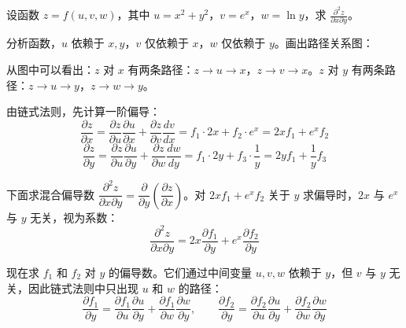\begin{myexample}
  设函数 $z = f(u,v,w)$，其中 $u = x^2 + y^2$，$v = e^x$，$w = \ln y$，求 $\frac{\partial^2 z}{\partial x \partial y}$。

  分析函数，\(u\) 依赖于 \(x,y\)，\(v\) 仅依赖于 \(x\)，\(w\) 仅依赖于 \(y\)。画出路径关系图：

\begin{center}
\end{center}

从图中可以看出：\(z\) 对 \(x\) 有两条路径：\(z \to u \to x\)，\(z \to v \to x\)。\(z\) 对 \(y\) 有两条路径：\(z \to u \to y\)，\(z \to w \to y\)。

由链式法则，先计算一阶偏导：
\[
\frac{\partial z}{\partial x} = \frac{\partial z}{\partial u} \frac{\partial u}{\partial x} + \frac{\partial z}{\partial v} \frac{d v}{d x}
= f_1 \cdot 2x + f_2 \cdot e^x = 2x f_1 + e^x f_2
\]
\[
\frac{\partial z}{\partial y} = \frac{\partial z}{\partial u} \frac{\partial u}{\partial y} + \frac{\partial z}{\partial w} \frac{d w}{d y}
= f_1 \cdot 2y + f_3 \cdot \frac{1}{y} = 2y f_1 + \frac{1}{y} f_3
\]

下面求混合偏导数 \(\dfrac{\partial^2 z}{\partial x \partial y} = \dfrac{\partial}{\partial y}\!\left(\dfrac{\partial z}{\partial x}\right)\)。对 \(2x f_1 + e^x f_2\) 关于 \(y\) 求偏导时，\(2x\) 与 \(e^x\) 与 \(y\) 无关，视为系数：
\[
\frac{\partial^2 z}{\partial x \partial y} = 2x \frac{\partial f_1}{\partial y} + e^x \frac{\partial f_2}{\partial y}
\]

现在求 \(f_1\) 和 \(f_2\) 对 \(y\) 的偏导数。它们通过中间变量 \(u,v,w\) 依赖于 \(y\)，但 \(v\) 与 \(y\) 无关，因此链式法则中只出现 \(u\) 和 \(w\) 的路径：
\[
\frac{\partial f_1}{\partial y} = \frac{\partial f_1}{\partial u}\frac{\partial u}{\partial y} + \frac{\partial f_1}{\partial w}\frac{\partial w}{\partial y},
\qquad
\frac{\partial f_2}{\partial y} = \frac{\partial f_2}{\partial u}\frac{\partial u}{\partial y} + \frac{\partial f_2}{\partial w}\frac{\partial w}{\partial y}
\]


\end{myexample}
